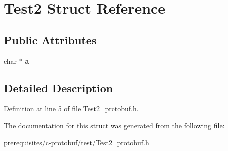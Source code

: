 \hypertarget{struct_test2}{}\section{Test2 Struct Reference}
\label{struct_test2}
\subsection*{Public Attributes}
\begin{DoxyCompactItemize}
\item 
\mbox{\label{struct_test2_a2c360236f00ec28d2ec8b74c996621dc}} 
char $\ast$ {\bfseries a}
\end{DoxyCompactItemize}


\subsection{Detailed Description}


Definition at line 5 of file Test2\+\_\+protobuf.\+h.



The documentation for this struct was generated from the following file\+:\begin{DoxyCompactItemize}
\item 
prerequisites/c-\/protobuf/test/Test2\+\_\+protobuf.\+h\end{DoxyCompactItemize}
